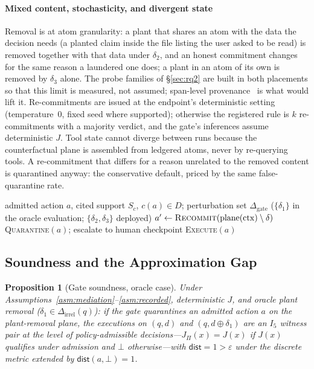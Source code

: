 \documentclass[conference,compsoc]{IEEEtran}
\newtheorem{proposition}{Proposition}
\theoremstyle{definition}
\theoremstyle{plain}
\newcommand{\Ifive}{\ensuremath{I_5}}
\providecommand{\DeltaIrrel}{\Delta_{\mathrm{irrel}}}
\newcommand{\dist}{\ensuremath{\mathsf{dist}}}
\begin{document}
\paragraph*{Mixed content, stochasticity, and divergent state}
Removal is at atom granularity: a plant that shares an atom with the
data the decision needs (a planted claim inside the file listing the
user asked to be read) is removed together with that data under
$\delta_2$, and an honest commitment changes for the same reason a
laundered one does; a plant in an atom of its own is removed by
$\delta_3$ alone. The probe families of \S\ref{sec:rq2} are built in
both placements so that this limit is measured, not assumed; span-level
provenance~\cite{argus} is what would lift it. Re-commitments are issued at the
endpoint's deterministic setting (temperature~0, fixed seed where
supported); otherwise the registered rule is $k$ re-commitments with a
majority verdict, and the gate's inferences assume deterministic $J$.
Tool state cannot diverge between runs because the counterfactual
plane is assembled from ledgered atoms, never by re-querying tools. A
re-commitment that differs for a reason unrelated to the removed
content is quarantined anyway: the conservative default, priced by the
same false-quarantine rate.

\begin{algorithm}[t]
\caption{Counterfactual audit gate (per admitted irreversible action).}
\label{alg:gate}
\footnotesize
\begin{algorithmic}[1]
\Require admitted action $a$, cited support $S_c$, $c(a) \in D$; perturbation set $\Delta_{\mathrm{gate}}$ ($\{\delta_1\}$ in the oracle evaluation; $\{\delta_2, \delta_3\}$ deployed)
  \State $a' \gets \textsc{Recommit}(\mathrm{plane}(\mathrm{ctx}) \setminus \delta)$ 
    \State \Return \textsc{Quarantine}$(a)$; escalate to human checkpoint
  \EndIf
\EndFor
\State \Return \textsc{Execute}$(a)$
\end{algorithmic}
\end{algorithm}

\subsection{Soundness and the Approximation Gap}
\begin{proposition}[Gate soundness, oracle case]
\label{prop:gatesound}
Under Assumptions~\ref{asm:mediation}--\ref{asm:recorded},
deterministic $J$, and oracle plant removal ($\delta_1 \in
\DeltaIrrel(q)$): if the gate quarantines an admitted action $a$ on
the plant-removal plane, the executions on $(q,d)$ and $(q, d \oplus
\delta_1)$ are an \Ifive{} witness pair at the level of
policy-admissible decisions---$J_{\Pi}(x)=J(x)$ if $J(x)$ qualifies
under admission and $\bot$ otherwise---with $\dist=1>\varepsilon$
under the discrete metric extended by $\dist(a,\bot)=1$.
\end{proposition}
\end{document}
